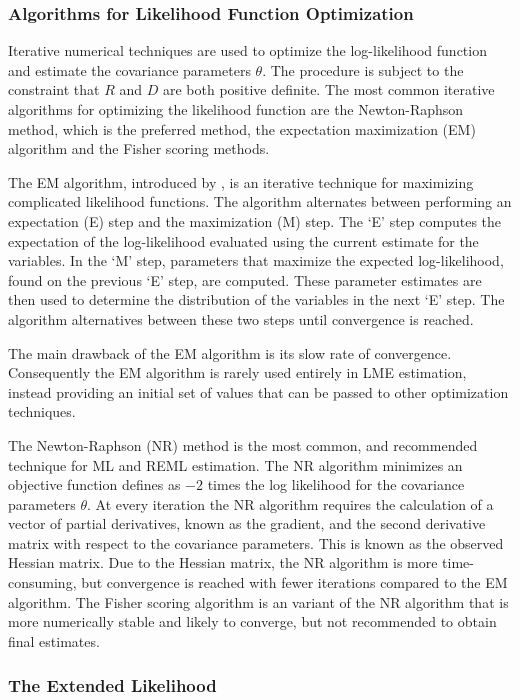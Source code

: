 \documentclass[12pt, a4paper]{report}
\theoremstyle{plain}
\theoremstyle{definition}
\theoremstyle{remark}
\begin{document}
\subsubsection{Algorithms for Likelihood Function Optimization}

Iterative numerical techniques are used to optimize the log-likelihood function and estimate the covariance parameters $\theta$. The procedure is subject to the constraint that $R$ and $D$ are both positive definite. The most common iterative algorithms for optimizing the likelihood function are the Newton-Raphson method, which is the preferred method, the expectation maximization (EM) algorithm and the Fisher scoring methods.
			
The EM algorithm, introduced by \citet{EM}, is an iterative technique for maximizing complicated likelihood functions. The algorithm alternates between performing an expectation (E) step and the maximization (M) step. The `E' step computes the expectation of the log-likelihood evaluated using the current estimate for the variables. In the `M' step, parameters that maximize the expected log-likelihood, found on the previous `E' step, are computed. These parameter estimates are then used to determine the distribution of the variables in the next `E' step. The algorithm alternatives between these two steps until convergence is reached.
			
The main drawback of the EM algorithm is its slow rate of convergence. Consequently the EM algorithm is rarely used entirely in LME estimation, instead providing an initial set of values that can be passed to other optimization techniques.
			
The Newton-Raphson (NR) method is the most common, and recommended technique for ML and REML estimation. The NR algorithm minimizes an objective function defines as $-2$ times the log likelihood for the covariance parameters $\theta$. At every iteration the NR algorithm requires the calculation of a vector of partial derivatives, known as the gradient, and the second derivative matrix with respect to the covariance parameters. This is known as the observed Hessian matrix. Due to the Hessian matrix, the NR algorithm is more time-consuming, but convergence is reached with fewer iterations compared to the EM algorithm. The Fisher scoring algorithm is an variant of the NR algorithm that is more numerically stable and likely to converge, but not recommended to obtain final estimates.
			
\subsubsection{The Extended Likelihood}
			
\end{document}
